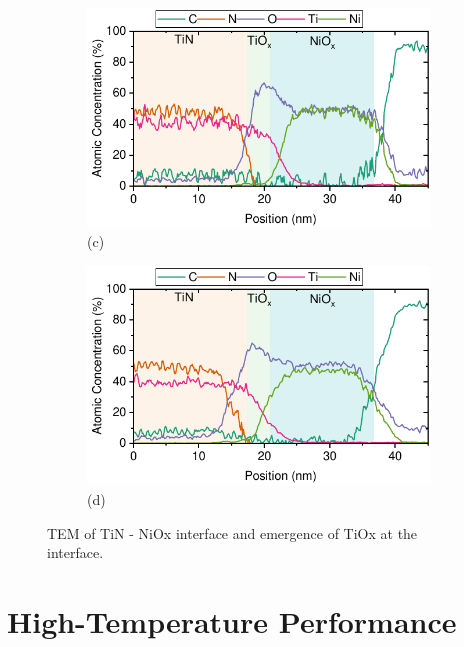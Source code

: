 \begin{figure}[htbp]
    \begin{subfigure}[t]{0.49\textwidth}
        \centering
        \includegraphics[width=\textwidth]{chapters/material_properties/images/TEM_30_min.pdf} %
        \caption*{(c)}
    \end{subfigure}
    \hfill
    \begin{subfigure}[t]{0.49\textwidth}
        \centering
        \includegraphics[width=\textwidth]{chapters/material_properties/images/TEM_60_min.pdf} %
        \caption*{(d)}
    \end{subfigure}
    \caption{TEM of TiN - NiOx interface and emergence of TiOx at the interface.}
    \label{fig:ch2:tem_pix_substrate}
\end{figure}



\section{High-Temperature Performance}




\cleardoublepage

